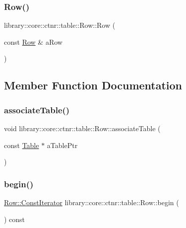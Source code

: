\subsubsection{\texorpdfstring{Row()}{Row()}\hspace{0.1cm}{\footnotesize\ttfamily [5/5]}}
{\footnotesize\ttfamily library\+::core\+::ctnr\+::table\+::\+Row\+::\+Row (\begin{DoxyParamCaption}\item[{const \mbox{\hyperlink{classlibrary_1_1core_1_1ctnr_1_1table_1_1_row}{Row}} \&}]{a\+Row }\end{DoxyParamCaption})}



\subsection{Member Function Documentation}
\mbox{\label{classlibrary_1_1core_1_1ctnr_1_1table_1_1_row_a1afbb0660b89062d230da20a46ee6335}} 
\subsubsection{\texorpdfstring{associateTable()}{associateTable()}}
{\footnotesize\ttfamily void library\+::core\+::ctnr\+::table\+::\+Row\+::associate\+Table (\begin{DoxyParamCaption}\item[{const \mbox{\hyperlink{classlibrary_1_1core_1_1ctnr_1_1_table}{Table}} $\ast$}]{a\+Table\+Ptr }\end{DoxyParamCaption})}

\mbox{\label{classlibrary_1_1core_1_1ctnr_1_1table_1_1_row_ac95a4df6fc29ca17d567e6a4560a2e9b}} 
\subsubsection{\texorpdfstring{begin()}{begin()}}
{\footnotesize\ttfamily \mbox{\hyperlink{classlibrary_1_1core_1_1ctnr_1_1table_1_1_row_a293725deae1bf660d85c2d3ce905cb40}{Row\+::\+Const\+Iterator}} library\+::core\+::ctnr\+::table\+::\+Row\+::begin (\begin{DoxyParamCaption}{ }\end{DoxyParamCaption}) const}

